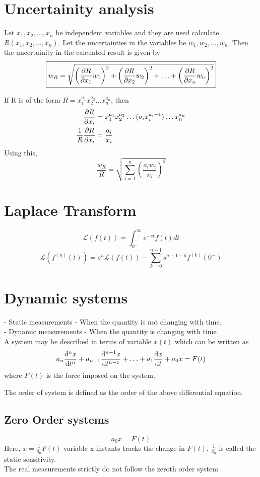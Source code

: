 \documentclass{article}
\newcommand{\Lagr}{\mathcal{L}}
\begin{document}
\section{Uncertainity analysis}
Let $x_1, x_2, \hdots, x_n$ be independent variables and they are used calculate $R(x_1,x_2,\hdots,x_n)$. Let the uncertainties in the variables be $w_1,w_2,\hdots,w_n$. Then the uncertainity in the calcuated result is given by
	\[\boxed{w_R = \sqrt{\left(\pdv{R}{x_1} w_1 \right)^2 + \left(\pdv{R}{x_2} w_2 \right)^2 + \hdots + \left(\pdv{R}{x_n} w_\nu \right)^2 }}\]


\noindent If R is of the form $R = x_1^{a_1} x_2^{a_2} \hdots x_n^{a_n}$, then 
	\begin{align*}
		\pdv{R}{x_i} &= x_1^{a_1} x_2^{a_2} \hdots (a_i x_i^{a_i -1}) \hdots x_n^{a_n}\\
		\frac{1}{R}\pdv{R}{x_i} &= \frac{a_i}{x_i}
	\end{align*}
	Using this, 
	\[\frac{w_R}{R} = \sqrt{\sum_{i=1}^n \left(\frac{a_i w_i}{x_i} \right)^2}\]




\section{Laplace Transform}
	\[\Lagr(f(t)) = \int_{0^-}^\infty e^{-st} f(t) dt\]
	\[\Lagr(f^{(n)}(t)) = s^n \Lagr(f(t)) - \sum_{k=0}^{n-1} s^{n-1-k} f^{(k)}(0^-) \]

\section{Dynamic systems}
- Static measurements - When the quantity is not changing with time. \\
- Dynamic measurements - When the quantity is changing with time\\
	A system may be described in terms of variable $x(t)$ which can be written as 
	\[a_n \dv[n]{x}{t} + a_{n-1} \dv[n-1]{x}{t} + \hdots + a_1 \dv{x}{t} + a_0 x= F(t)\]
	where $F(t)$ is the force imposed on the system.

	The order of system is defined as the order of the above differential equation.

	\subsection{Zero Order systems}
	\[a_0 x = F(t)\]
	Here, $x = \frac{1}{a_0} F(t)$ variable x instants tracks the change in $F(t)$, $\frac{1}{a_0}$ is called the static sensitivity.\\
	The real measurements strictly do not follow the zeroth order system 
\end{document}
